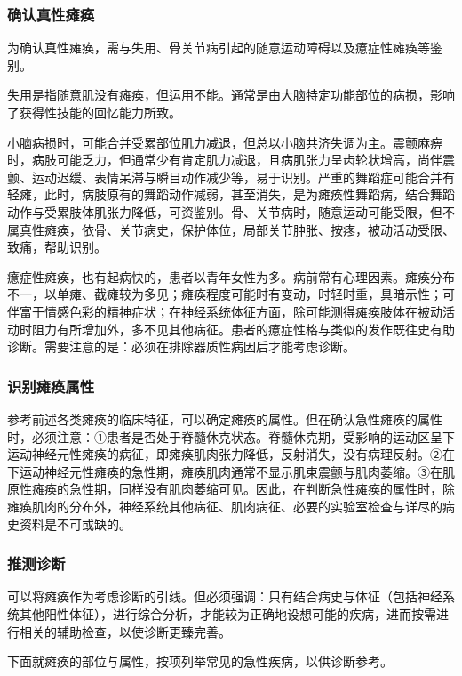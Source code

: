 \subsubsection{确认真性瘫痪}

为确认真性瘫痪，需与失用、骨关节病引起的随意运动障碍以及癔症性瘫痪等鉴别。

失用是指随意肌没有瘫痪，但运用不能。通常是由大脑特定功能部位的病损，影响了获得性技能的回忆能力所致。

小脑病损时，可能合并受累部位肌力减退，但总以小脑共济失调为主。震颤麻痹时，病肢可能乏力，但通常少有肯定肌力减退，且病肌张力呈齿轮状增高，尚伴震颤、运动迟缓、表情呆滞与瞬目动作减少等，易于识别。严重的舞蹈症可能合并有轻瘫，此时，病肢原有的舞蹈动作减弱，甚至消失，是为瘫痪性舞蹈病，结合舞蹈动作与受累肢体肌张力降低，可资鉴别。骨、关节病时，随意运动可能受限，但不属真性瘫痪，依骨、关节病史，保护体位，局部关节肿胀、按疼，被动活动受限、致痛，帮助识别。

癔症性瘫痪，也有起病快的，患者以青年女性为多。病前常有心理因素。瘫痪分布不一，以单瘫、截瘫较为多见；瘫痪程度可能时有变动，时轻时重，具暗示性；可伴富于情感色彩的精神症状；在神经系统体征方面，除可能测得瘫痪肢体在被动活动时阻力有所增加外，多不见其他病征。患者的癔症性格与类似的发作既往史有助诊断。需要注意的是：必须在排除器质性病因后才能考虑诊断。

\subsubsection{识别瘫痪属性}

参考前述各类瘫痪的临床特征，可以确定瘫痪的属性。但在确认急性瘫痪的属性时，必须注意：①患者是否处于脊髓休克状态。脊髓休克期，受影响的运动区呈下运动神经元性瘫痪的病征，即瘫痪肌肉张力降低，反射消失，没有病理反射。②在下运动神经元性瘫痪的急性期，瘫痪肌肉通常不显示肌束震颤与肌肉萎缩。③在肌原性瘫痪的急性期，同样没有肌肉萎缩可见。因此，在判断急性瘫痪的属性时，除瘫痪肌肉的分布外，神经系统其他病征、肌肉病征、必要的实验室检查与详尽的病史资料是不可或缺的。

\subsubsection{推测诊断}

可以将瘫痪作为考虑诊断的引线。但必须强调：只有结合病史与体征（包括神经系统其他阳性体征），进行综合分析，才能较为正确地设想可能的疾病，进而按需进行相关的辅助检查，以使诊断更臻完善。

下面就瘫痪的部位与属性，按项列举常见的急性疾病，以供诊断参考。

